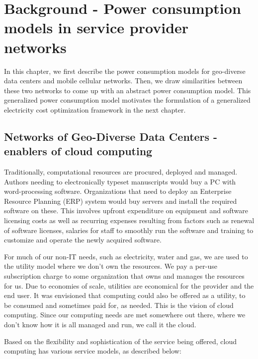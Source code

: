 \chapter{Background - Power consumption models in service provider networks}
\label{chap:background}
In this chapter, we first describe the power consumption models for geo-diverse data centers and mobile cellular networks. Then, we draw similarities between these two networks to come up with an abstract power consumption model. This generalized power consumption model motivates the formulation of a generalized electricity cost optimization framework in the next chapter. 

\section{Networks of Geo-Diverse Data Centers - enablers of cloud computing} Traditionally, computational resources are procured, deployed and managed. Authors needing to electronically typeset manuscripts would buy a PC with word-processing software. Organizations that need to deploy an Enterprise Resource Planning (ERP) system would buy servers and install the required software on these. This involves upfront expenditure on equipment and software licensing costs as well as recurring expenses resulting from factors such as renewal of software licenses, salaries for staff to smoothly run the software and training to customize and operate the newly acquired software. 

For much of our non-IT needs, such as electricity, water and gas, we are used to the utility model where we don't own the resources. We pay a per-use subscription charge to some organization that owns and manages the resources for us. Due to economies of scale, utilities are economical for the provider and the end user. It was envisioned that computing could also be offered as a utility, to be consumed and sometimes paid for, as needed. This is the vision of cloud computing. Since our computing needs are met somewhere out there, where we don't know how it is all managed and run, we call it the cloud.

Based on the flexibility and sophistication of the service being offered, cloud computing has various service models, as described below: 

